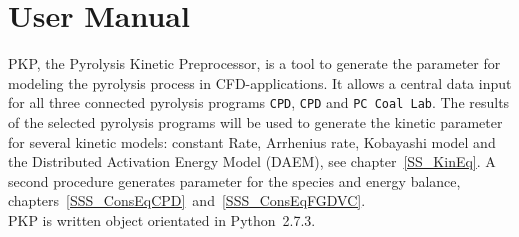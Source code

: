 \section{User Manual}\label{S_Manual}

PKP, the Pyrolysis Kinetic Preprocessor, is a tool to generate the parameter for modeling the pyrolysis process in CFD-applications. It allows a central data input for all three connected pyrolysis programs \texttt{CPD}, \texttt{CPD} and \texttt{PC Coal Lab}. The results of the selected pyrolysis programs will be used to generate the kinetic parameter for several kinetic models: constant Rate, Arrhenius rate, Kobayashi model and the Distributed Activation Energy Model (DAEM), see chapter~\ref{SS_KinEq}. A second procedure generates parameter for the species and energy balance, chapters~\ref{SSS_ConsEqCPD}~and~\ref{SSS_ConsEqFGDVC}.\\
PKP is written object orientated in Python~2.7.3.

